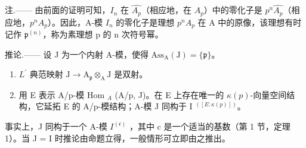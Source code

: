 注.—— 由前面的证明可知，\(I_{n}\) 在 \(\widehat{A_{p}}\)（相应地，在 \(A_{p}\)）中的零化子是 \(p^{n}\widehat{A_{p}}\)（相应地，\(p^{n}A_{p}\)）。因此，A-模 \(I_{n}\) 的零化子是理想 \(p^{n}A_{p}\) 在 A 中的原像，该理想有时记作 \(\mathfrak{p}^{(n)}\)，称为素理想 p 的 n 次符号幂。

推论.—— 设 J 为一个内射 A-模，使得 \(\mathrm{Ass}_{\mathrm{A}}(\mathrm{J}) = \{\mathfrak{p}\}\)。

\begin{enumerate}
\def\labelenumi{\alph{enumi})}
\item
  \(L^{\prime}\) 典范映射 \(\mathrm{J} \to \mathrm{A}_{\mathfrak{p}} \otimes_{\mathrm{A}} \mathrm{J}\) 是双射。
\item
  用 E 表示 A/p-模 Hom \(_A\) (A/p, J)。在 E 上存在唯一的 \(\kappa(p)\)-向量空间结构，它延拓 E 的 A/p-模结构；A-模 J 同构于 I \(^{([E:\kappa(p)])}\)。
\end{enumerate}

事实上，J 同构于一个 A-模 \(I^{(\mathfrak{c})}\) ，其中 c 是一个适当的基数（第 1 节，定理 1）。当 J = I 时推论由命题立得，一般情形可立即由之推出。

